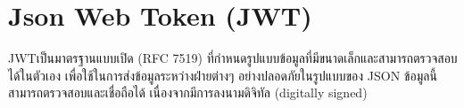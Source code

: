 \section{Json Web Token (JWT)}
\hspace{1.27cm}JWT\cite{jwt}เป็นมาตรฐานแบบเปิด (RFC 7519) ที่กำหนดรูปแบบข้อมูลที่มีขนาดเล็กและสามารถตรวจสอบได้ในตัวเอง เพื่อใช้ในการส่งข้อมูลระหว่างฝ่ายต่างๆ อย่างปลอดภัยในรูปแบบของ JSON ข้อมูลนี้สามารถตรวจสอบและเชื่อถือได้ เนื่องจากมีการลงนามดิจิทัล (digitally signed)










